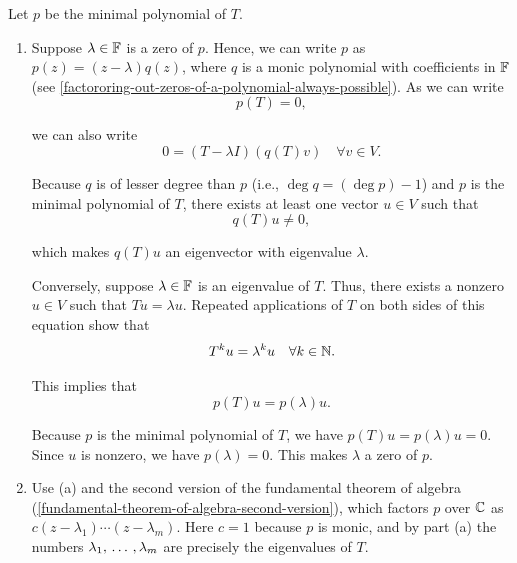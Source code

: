 \begin{prf} Let $p$ be the minimal polynomial of $T$.
  \begin{enumerate}[label=\textbf{(\alph*)}]
    \item \Rightarrowdirection Suppose $\lambda \in \mathbb{F}$ is a zero of $p$. Hence, we can write $p$ as $p(z)=(z-\lambda)q(z)$, where $q$ is a monic polynomial with coefficients in $\mathbb{F}$ (see \ref{factororing-out-zeros-of-a-polynomial-always-possible}). As we can write
    \begin{equation}
      p(T)=0,
    \end{equation}

    we can also write
    \begin{equation}
      0=(T-\lambda I)(q(T)v) \quad \forall v\in V.
    \end{equation}

    Because $q$ is of lesser degree than $p$ (i.e., $\deg q = (\deg p) -1$) and $p$ is the minimal polynomial of $T$, there exists at least one vector $u\in V$ such that
    \begin{equation}
      q(T)u \neq 0,
    \end{equation}

    which makes $q(T)u$ an eigenvector with eigenvalue $\lambda$.

    \Leftarrowdirection Conversely, suppose $\lambda \in \mathbb{F}$ is an eigenvalue of $T$. Thus, there exists a nonzero $u\in V$ such that $Tu=\lambda u$. Repeated applications of $T$ on both sides of this equation show that
    \begin{equation}
      T^ku =\lambda^k u \quad \forall k\in \mathbb{N}.
    \end{equation}

    This implies that
    \begin{equation}
      p(T)u=p(\lambda)u.
    \end{equation}

    Because $p$ is the minimal polynomial of $T$, we have $p(T)u=p(\lambda)u=0$. Since $u$ is nonzero, we have $p(\lambda) = 0$. This makes $\lambda$ a zero of $p$.

    \item Use (a) and the second version of the fundamental theorem of algebra (\ref{fundamental-theorem-of-algebra-second-version}), which factors $p$ over $\mathbb{C}$ as $c(z-\lambda_1)\cdots(z-\lambda_m)$. Here $c = 1$ because $p$ is monic, and by part (a) the numbers $\lambda_1, {\, \ldots \,\,}, \lambda_m$ are precisely the eigenvalues of $T$.
  \end{enumerate}
  \vspace*{-\baselineskip}
\end{prf}

